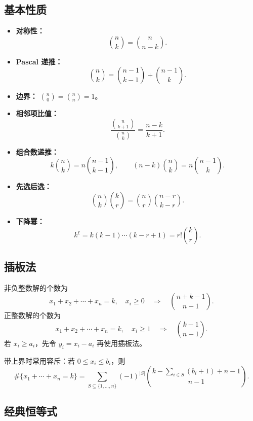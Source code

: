\subsection{基本性质}

\begin{itemize}
    \item \textbf{对称性：}
    \[
        \binom{n}{k}=\binom{n}{n-k}.
    \]
    \item \textbf{Pascal 递推：}
    \[
        \binom{n}{k}=\binom{n-1}{k-1}+\binom{n-1}{k}.
    \]
    \item \textbf{边界：} $\binom{n}{0}=\binom{n}{n}=1$。
    \item \textbf{相邻项比值：}
    \[
        \frac{\binom{n}{k+1}}{\binom{n}{k}}=\frac{n-k}{k+1}.
    \]
    \item \textbf{组合数递推：}
    \[
        k\binom{n}{k}=n\binom{n-1}{k-1},\qquad
        (n-k)\binom{n}{k}=n\binom{n-1}{k}.
    \]
    \item \textbf{先选后选：}
    \[
        \binom{n}{k}\binom{k}{r}
        =\binom{n}{r}\binom{n-r}{k-r}.
    \]
    \item \textbf{下降幂：}
    \[
        k^{\underline r}=k(k-1)\cdots(k-r+1)=r!\binom{k}{r}.
    \]
\end{itemize}

\subsection{插板法}

非负整数解的个数为
\[
    x_1+x_2+\cdots+x_n=k,\quad x_i\ge0
    \quad\Longrightarrow\quad
    \binom{n+k-1}{n-1}.
\]
正整数解的个数为
\[
    x_1+x_2+\cdots+x_n=k,\quad x_i\ge1
    \quad\Longrightarrow\quad
    \binom{k-1}{n-1}.
\]
若 $x_i\ge a_i$，先令 $y_i=x_i-a_i$ 再使用插板法。

带上界时常用容斥：若 $0\le x_i\le b_i$，则
\[
\#\{x_1+\cdots+x_n=k\}
 =\sum_{S\subseteq\{1,\dots,n\}}(-1)^{|S|}
 \binom{k-\sum_{i\in S}(b_i+1)+n-1}{n-1}.
\]

\subsection{经典恒等式}

